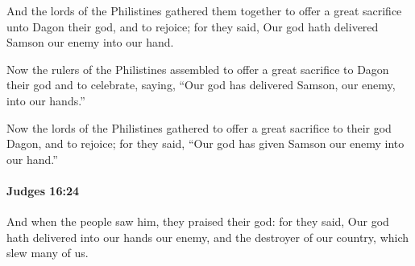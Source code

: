 			\begin{versebox}
					\item[BHS] 
					\item[ASV] And the lords of the Philistines gathered them together to offer a great sacrifice unto Dagon their god, and to rejoice; for they said, Our god hath delivered Samson our enemy into our hand.
					\item[NIV] Now the rulers of the Philistines assembled to offer a great sacrifice to Dagon their god and to celebrate, saying, “Our god has delivered Samson, our enemy, into our hands.”
					\item[NRSV] Now the lords of the Philistines gathered to offer a great sacrifice to their god Dagon, and to rejoice; for they said, “Our god has given Samson our enemy into our hand.”
			\end{versebox}

		\paragraph{Judges 16:24} %
			\label{JUDGES-16-24}

			And when the people saw him, they praised their god: for they said, Our god hath delivered into our hands our enemy, and the destroyer of our country, which slew many of us.

